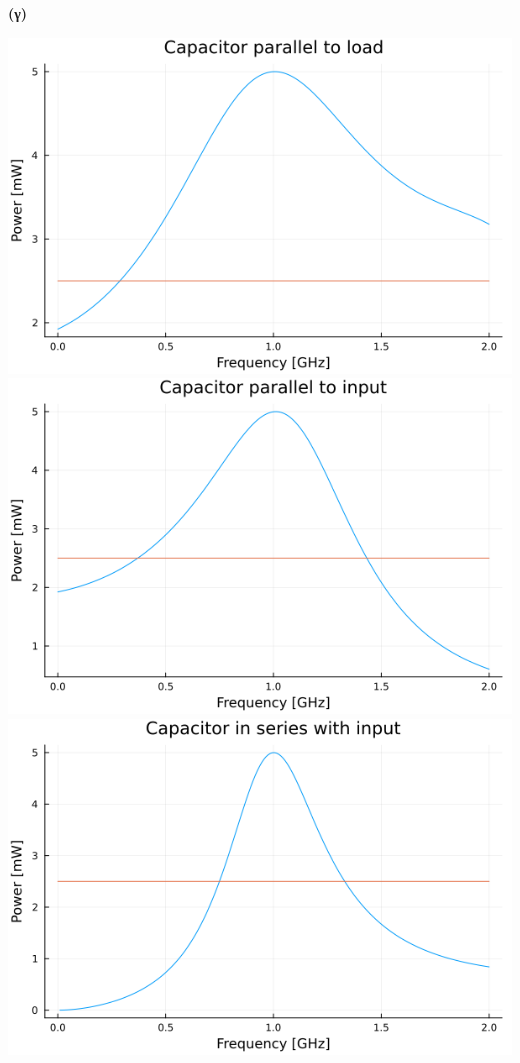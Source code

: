 \documentclass[12pt]{article}
\begin{document}
\textbf{(γ)} 
\begin{center}
    \includegraphics*[scale=0.5]{1-3-c_A.png}
    \includegraphics*[scale=0.5]{1-3-c_B.png}
    \includegraphics*[scale=0.5]{1-3-c_C.png}
\end{center} 
\end{document}
